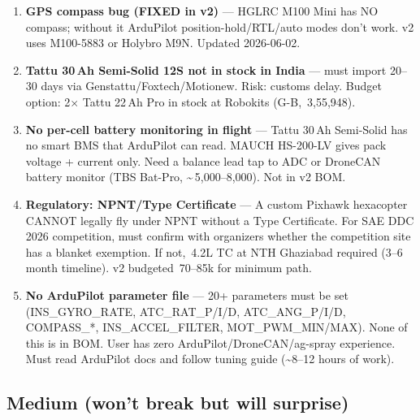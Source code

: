 \documentclass[11pt,a4paper]{article}
\newcommand{\Rs}{\rupee\,}
\begin{document}
\begin{enumerate}
  \item \textbf{GPS compass bug (FIXED in v2)} --- HGLRC M100 Mini has NO compass; without it ArduPilot position-hold/RTL/auto modes don't work. v2 uses M100-5883 or Holybro M9N. Updated 2026-06-02.
  \item \textbf{Tattu 30\,Ah Semi-Solid 12S not in stock in India} --- must import 20--30 days via Genstattu/Foxtech/Motionew. Risk: customs delay. Budget option: 2$\times$ Tattu 22\,Ah Pro in stock at Robokits (G-B, \Rs{}3,55,948).
  \item \textbf{No per-cell battery monitoring in flight} --- Tattu 30\,Ah Semi-Solid has no smart BMS that ArduPilot can read. MAUCH HS-200-LV gives pack voltage + current only. Need a balance lead tap to ADC or DroneCAN battery monitor (TBS Bat-Pro, \textasciitilde{}\Rs{}5,000--8,000). Not in v2 BOM.
  \item \textbf{Regulatory: NPNT/Type Certificate} --- A custom Pixhawk hexacopter CANNOT legally fly under NPNT without a Type Certificate. For SAE DDC 2026 competition, must confirm with organizers whether the competition site has a blanket exemption. If not, \Rs{}4.2L TC at NTH Ghaziabad required (3--6 month timeline). v2 budgeted \Rs{}70--85k for minimum path.
  \item \textbf{No ArduPilot parameter file} --- 20+ parameters must be set (INS\_GYRO\_RATE, ATC\_RAT\_P/I/D, ATC\_ANG\_P/I/D, COMPASS\_*, INS\_ACCEL\_FILTER, MOT\_PWM\_MIN/MAX). None of this is in BOM. User has zero ArduPilot/DroneCAN/ag-spray experience. Must read ArduPilot docs and follow tuning guide (\textasciitilde{}8--12 hours of work).
\end{enumerate}

\subsection{Medium (won't break but will surprise)}
\end{document}

